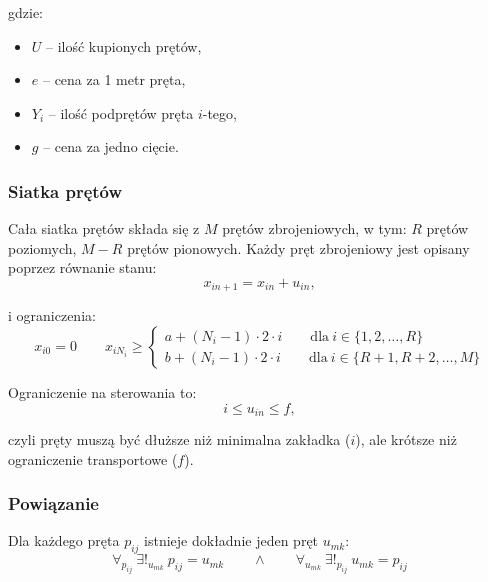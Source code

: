 \documentclass[11pt]{article}
\begin{document}
{gdzie:
\begin{itemize}[ ]
\item $U$ -- ilość kupionych prętów,
\item $e$ -- cena za 1 metr pręta,
\item $Y_i$ -- ilość podprętów pręta $i$-tego,
\item $g$ -- cena za jedno cięcie.
\end{itemize}

\subsubsection*{Siatka prętów}

Cała siatka prętów składa się z $M$ prętów zbrojeniowych, w tym: $R$ prętów poziomych, $M - R$ prętów pionowych. Każdy pręt zbrojeniowy jest opisany poprzez równanie stanu:
\begin{equation*}
x_{in+1} = x_{in} + u_{in},
\end{equation*}

i ograniczenia:
\begin{equation*}
x_{i0} = 0 \qquad
x_{iN_i} \ge
	\begin{cases}
	a + (N_i - 1) \cdot 2 \cdot i \qquad \text{dla} \ i \in \{1, 2, \ldots, R\} \\
	b + (N_i - 1) \cdot 2 \cdot i \qquad \text{dla} \ i \in \{R+1, R+2, \ldots, M\}
	\end{cases}
\end{equation*}

Ograniczenie na sterowania to:
\begin{equation*}
i \le u_{in} \le f,
\end{equation*}

czyli pręty muszą być dłuższe niż minimalna zakładka ($i$), ale krótsze niż ograniczenie transportowe ($f$).

\subsubsection*{Powiązanie}
Dla każdego pręta $p_{ij}$ istnieje dokładnie jeden pręt $u_{mk}$:
\begin{equation*}
\forall_{p_{ij}} \ \exists!_{u_{mk}} \ p_{ij} = u_{mk}
\qquad \land \qquad
\forall_{u_{mk}} \ \exists!_{p_{ij}} \ u_{mk} = p_{ij}
\end{equation*}

\newpage
}{}
\end{document}
